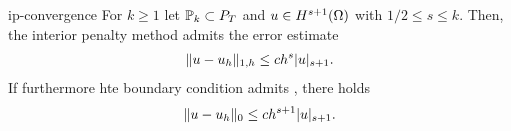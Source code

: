 \begin{Theorem}{ip-convergence}
  For $k\ge 1$ let $\mathbb P_k\subset P_T$ and $u\in H^{s+1}(\Omega)$ with
  $1/2 \le s \le k$. Then, the interior penalty method admits the
  error estimate
  \begin{gather}
    \lVert u-u_h\rVert_{1,h} \le c h^s \lvert u\rvert_{s+1}.
  \end{gather}
  If furthermore hte boundary condition admits ,
there holds
  \begin{gather}
    \lVert u-u_h\rVert_{0} \le c h^{s+1} \lvert u\rvert_{s+1}.
  \end{gather}
\end{Theorem}






